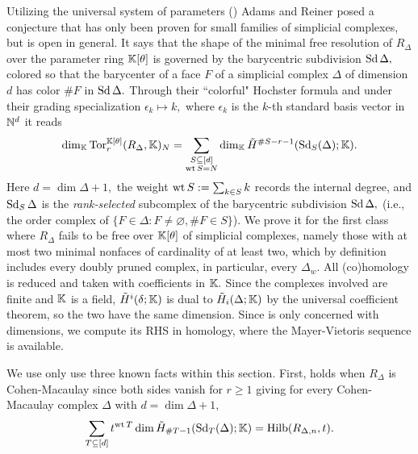 Utilizing the universal system of parameters () Adams and Reiner posed a conjecture \cite[Conj.~6.1]{adams-reiner} that has only been proven for small families of simplicial complexes, but is open in general. It says that the shape of the minimal free resolution of $R_\Delta$ over the parameter ring $\mathbb{K}[\theta]$ is governed by the barycentric subdivision $\operatorname{Sd}\Delta,$ colored so that the barycenter of a face $F$ of a simplicial complex $\Delta$ of dimension $d$ has color $\# F$ in $\operatorname{Sd}\Delta.$ Through their ``colorful" Hochster formula \cite[Thm.~3.3]{adams-reiner} and under their grading specialization $\epsilon_k\mapsto k,$ where $\epsilon_k$ is the $k$-th standard basis vector in $\mathbb{N}^d$ it reads
\begin{equation}
\label{eq: Adams-Reiner conj}
    \dim_{\mathbb{K}}
    \operatorname{Tor}_r^{\mathbb{K}[\theta]}(R_\Delta,\mathbb{K})_{N} =
    \sum_{\substack{
    S\subseteq [d] \\
    \operatorname{wt} S = N
    }}
    \dim_{\mathbb{K}} \Tilde{H}^{\# S - r - 1}(\operatorname{Sd}_S(\Delta);\mathbb{K}).
\end{equation}
Here $d = \dim\Delta + 1,$ the weight $\operatorname{wt} S: = \sum_{k\in S}k$ records the internal degree, and $\operatorname{Sd}_S\Delta$ is the \emph{rank-selected} subcomplex of the barycentric subdivision $\operatorname{Sd}\Delta,$ (i.e., the order complex of $\{F\in\Delta:F\neq\varnothing,\# F\in S\}$).
We prove it for the first class where $R_\Delta$ fails to be free over $\mathbb{K}[\theta]$ of simplicial complexes, namely those with at most two minimal nonfaces of cardinality of at least two, which by definition includes every doubly pruned complex, in particular, every $\Delta_w$. 
All (co)homology is reduced and taken with coefficients in $\mathbb{K}.$ Since the complexes involved are finite and $\mathbb{K}$ is a field, $\Tilde{H}^i(\delta;\mathbb{K})$ is dual to $\Tilde{H}_i(\Delta;\mathbb{K})$ by the universal coefficient theorem, so the two have the same dimension. Since  is only concerned with dimensions, we compute its RHS in homology, where the Mayer-Vietoris sequence is available.


We use only use three known facts within this section. First,  holds when $R_\Delta$ is Cohen-Macaulay \cite[Cor.~6.7]{adams-reiner} since both sides vanish for $r\geq 1$ giving for every Cohen-Macaulay complex $\Delta$ with $d = \dim\Delta + 1,$
\begin{equation}
\label{eq: conjecture in the CM case}
    \sum_{T\subseteq[d]}t^{\operatorname{wt} T}\dim\Tilde{H}_{\#T-1}(\operatorname{Sd}_T(\Delta); \mathbb{K}) = \mathrm{Hilb}(R_{\Delta,n},t).
\end{equation}

